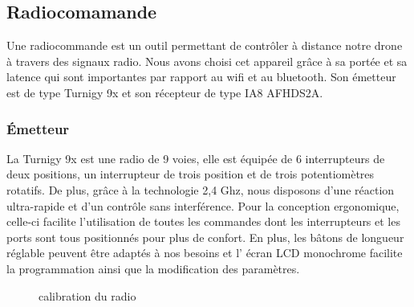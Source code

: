 	\subsection {Radiocomamande}
	Une radiocommande est un outil permettant de contrôler à distance notre drone à travers des signaux radio. Nous avons choisi cet appareil grâce à sa portée et sa latence qui sont importantes par rapport au wifi et au bluetooth. Son émetteur est de type Turnigy 9x et son récepteur de type IA8 AFHDS2A.
	
	\subsubsection{Émetteur} 
	La Turnigy 9x est une radio de 9 voies, elle est équipée de 6 interrupteurs de deux positions, un interrupteur de trois position et de trois potentiomètres rotatifs.
	De plus, grâce à la technologie 2,4 Ghz, nous disposons d'une réaction ultra-rapide et d'un contrôle sans interférence. Pour la
	conception ergonomique, celle-ci facilite l'utilisation de toutes les commandes dont les interrupteurs et les ports sont tous positionnés pour plus de confort\cite{Hobbyking}. En plus, les bâtons de longueur réglable peuvent être adaptés à nos besoins et l' écran LCD monochrome facilite la programmation ainsi que la modification des paramètres. 
	
	\begin{figure} [H]
		\begin{center}
			\centering
		\end{center}
		\caption{calibration du radio}
	\end{figure}

